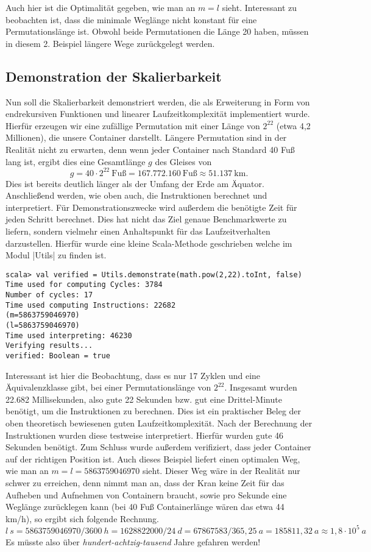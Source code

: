 Auch hier ist die Optimalität gegeben, wie man an $m = l$ sieht.
Interessant zu beobachten ist, dass die minimale Weglänge nicht konstant für eine Permutationslänge ist.
Obwohl beide Permutationen die Länge 20 haben, müssen in diesem 2. Beispiel längere Wege zurückgelegt werden.
\subsection{Demonstration der Skalierbarkeit}
\label{scalability}
Nun soll die Skalierbarkeit demonstriert werden,
die als Erweiterung in Form von endrekursiven Funktionen und linearer Laufzeitkomplexität implementiert wurde.\\
Hierfür erzeugen wir eine zufällige Permutation mit einer Länge von $2^{22}$ (etwa 4,2 Millionen), die unsere Container darstellt.
Längere Permutation sind in der Realität nicht zu erwarten, denn wenn jeder Container nach Standard 40 Fuß lang ist, ergibt dies eine Gesamtlänge $g$ des Gleises von
 \[ g = 40 \cdot 2^{22}\ \text{Fuß} = 167.772.160\ \text{Fuß} \approx 51.137\ \text{km}. \]
Dies ist bereits deutlich länger als der Umfang der Erde am Äquator.
Anschließend werden, wie oben auch, die Instruktionen berechnet und interpretiert.
Für Demonstrationszwecke wird außerdem die benötigte Zeit für jeden Schritt berechnet.
Dies hat nicht das Ziel genaue Benchmarkwerte zu liefern, sondern vielmehr einen Anhaltspunkt für das Laufzeitverhalten darzustellen.
Hierfür wurde eine kleine Scala-Methode geschrieben welche im Modul |Utils| zu finden ist.
\begin{lstlisting}
scala> val verified = Utils.demonstrate(math.pow(2,22).toInt, false)
Time used for computing Cycles: 3784
Number of cycles: 17
Time used computing Instructions: 22682
(m=5863759046970)
(l=5863759046970)
Time used interpreting: 46230
Verifying results...
verified: Boolean = true
\end{lstlisting}
\lstset{basicstyle=\ttfamily}
Interessant ist hier die Beobachtung, dass es nur 17 Zyklen und eine Äquivalenzklasse gibt, bei einer Permutationslänge von $2^{22}$.
Insgesamt wurden 22.682 Millisekunden, also gute 22 Sekunden bzw. gut eine Drittel-Minute benötigt, um die Instruktionen zu berechnen.
Dies ist ein praktischer Beleg der oben theoretisch bewiesenen guten Laufzeitkomplexität.
Nach der Berechnung der Instruktionen wurden diese testweise interpretiert. Hierfür wurden gute 46 Sekunden benötigt.
Zum Schluss wurde außerdem verifiziert, dass jeder Container auf der richtigen Position ist.
Auch dieses Beispiel liefert einen optimalen Weg, wie man an $m = l = 5863759046970$ sieht.
Dieser Weg wäre in der Realität nur schwer zu erreichen, denn nimmt man an, dass der Kran keine Zeit für das Aufheben und Aufnehmen von Containern braucht,
 sowie pro Sekunde eine Weglänge zurücklegen kann (bei 40 Fuß Containerlänge wären das etwa 44 km/h), so ergibt sich folgende Rechnung.
\[l\ s = 5863759046970 / 3600\ h = 1628822000 / 24\ d = 67867583 / 365,25\ a = 185811,32\ a \approx 1,8 \cdot 10^{5}\ a \]
Es müsste also über \emph{hundert-achtzig-tausend} Jahre gefahren werden!
\clearpage

